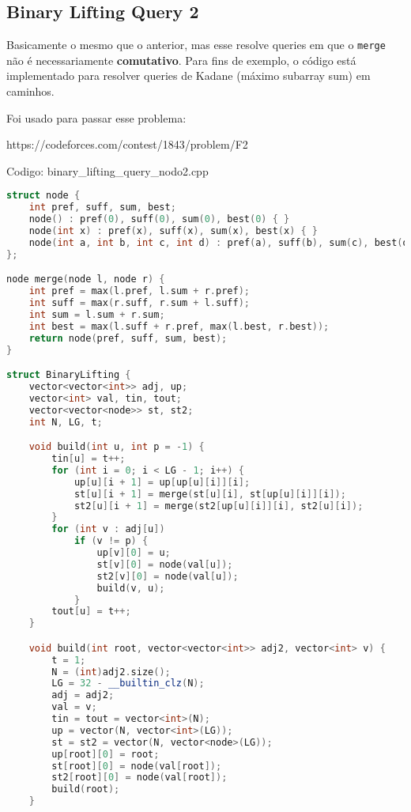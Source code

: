 \documentclass[10pt, a4paper, oneside]{book}
\begin{document}
\subsection{Binary Lifting Query 2}


Basicamente o mesmo que o anterior, mas esse resolve queries em que o \texttt{merge} não é necessariamente \textbf{comutativo}. Para fins de exemplo, o código está implementado para resolver queries de Kadane (máximo subarray sum) em caminhos.



Foi usado para passar esse problema:

https://codeforces.com/contest/1843/problem/F2
\hfill

Codigo: binary\_lifting\_query\_nodo2.cpp

\begin{lstlisting}[language=C++]
struct node {
    int pref, suff, sum, best;
    node() : pref(0), suff(0), sum(0), best(0) { }
    node(int x) : pref(x), suff(x), sum(x), best(x) { }
    node(int a, int b, int c, int d) : pref(a), suff(b), sum(c), best(d) { }
};

node merge(node l, node r) {
    int pref = max(l.pref, l.sum + r.pref);
    int suff = max(r.suff, r.sum + l.suff);
    int sum = l.sum + r.sum;
    int best = max(l.suff + r.pref, max(l.best, r.best));
    return node(pref, suff, sum, best);
}

struct BinaryLifting {
    vector<vector<int>> adj, up;
    vector<int> val, tin, tout;
    vector<vector<node>> st, st2;
    int N, LG, t;

    void build(int u, int p = -1) {
        tin[u] = t++;
        for (int i = 0; i < LG - 1; i++) {
            up[u][i + 1] = up[up[u][i]][i];
            st[u][i + 1] = merge(st[u][i], st[up[u][i]][i]);
            st2[u][i + 1] = merge(st2[up[u][i]][i], st2[u][i]);
        }
        for (int v : adj[u])
            if (v != p) {
                up[v][0] = u;
                st[v][0] = node(val[u]);
                st2[v][0] = node(val[u]);
                build(v, u);
            }
        tout[u] = t++;
    }

    void build(int root, vector<vector<int>> adj2, vector<int> v) {
        t = 1;
        N = (int)adj2.size();
        LG = 32 - __builtin_clz(N);
        adj = adj2;
        val = v;
        tin = tout = vector<int>(N);
        up = vector(N, vector<int>(LG));
        st = st2 = vector(N, vector<node>(LG));
        up[root][0] = root;
        st[root][0] = node(val[root]);
        st2[root][0] = node(val[root]);
        build(root);
    }


\end{lstlisting}
\end{document}
